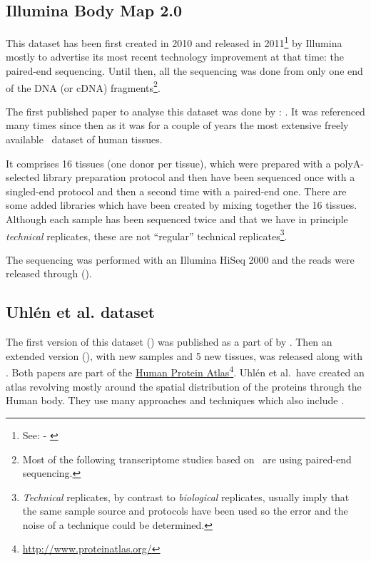 \subsection{Illumina Body Map 2.0}
This dataset has been first created in 2010 and released in
2011\footnote{See:  - \cite{ibmEnsembl}} by Illumina
mostly to advertise its most recent technology improvement at that time:
the paired-end sequencing.
Until then, all the sequencing was done from only one end of the \gls{DNA} (or
\gls{cDNA}) fragments\footnote{Most of the following transcriptome
studies based on \Rnaseq\ are using paired-end sequencing.}.

The first published paper to analyse this dataset was done by
\citet{ibmrelatedpaper}: .
It was referenced many times since then as it was for a couple of years
the most extensive freely available \Rnaseq\ dataset of human tissues.

It comprises 16 tissues (one donor per tissue), which were prepared with a
polyA-selected library preparation protocol and then have been sequenced once
with a singled-end protocol and then a second time with a paired-end one. There
are some added libraries which have been created by mixing together the 16 tissues.
Although each sample has been sequenced twice and that we have in principle
\emph{technical} replicates, these are not ``regular'' technical
replicates\footnote{\emph{Technical} replicates,
by contrast to \emph{biological} replicates,
usually imply that the same sample source and protocols have been used so the
error and the noise of a technique could be determined.}.

The sequencing was performed with an Illumina HiSeq 2000 and the reads were
released through  ().


\subsection{Uhlén et al. dataset}

The first version of this dataset () was published
as a part of  by \citet{Uhlen2014}. Then an extended
version (), with new samples and 5 new tissues,
was released along with  \citep{Uhlen2015}.
Both papers are part of the
\href{http://www.proteinatlas.org/}{Human Protein Atlas}\footnote{%
\href{http://www.proteinatlas.org/}{http://www.proteinatlas.org/}}.
Uhlén et al.\ have created
an atlas revolving mostly around the spatial distribution of the proteins through
the Human body. They use many approaches and techniques which also include \Rnaseq.

